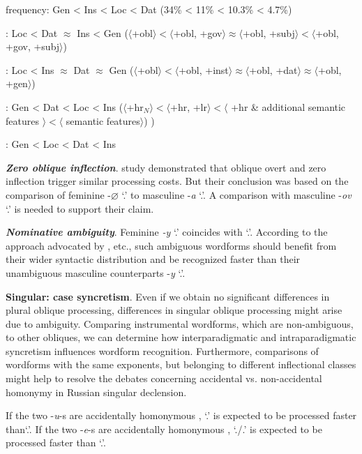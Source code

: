\documentclass[output=paper, modfonts,newtxmath,hidelinks]{langscibook}
\begin{document}
\ea \ea \label{ex:freqpl} frequency: Gen < Ins < Loc < Dat (34\% < 11\% < 10.3\% < 4.7\%)
    
    \ex \label{ex:mueller}  \citealt{muller2004decomposing}: Loc < Dat $\approx$ Ins < Gen ($\langle$+obl$\rangle < \langle$+obl, +gov$\rangle \approx \langle$+obl, +subj$\rangle < \langle$+obl, +gov, +subj$\rangle$)
    
    \ex \label{ex:wiese}	\citealt{wiese2004categories}:  Loc < Ins $\approx$ Dat $\approx$ Gen ($\langle$+obl$\rangle < \langle$+obl, +inst$\rangle \approx \langle$+obl, +dat$\rangle \approx \langle$+obl, +gen$\rangle$)
    
    \ex \label{ex:wunderlich}	\citealt{wunderlich1996minimalist}: Gen < Dat < Loc < Ins ($\langle$+hr$_N \rangle < \langle$+hr, +lr$\rangle < \langle$ +hr \& additional semantic features $\rangle < \langle$ semantic features$\rangle$) 
)
    
    \ex \label{ex:caha} \citealt{caha2008case}: Gen < Loc < Dat < Ins
    \z
\z

\textbf{\textit{Zero oblique inflection}}.  study demonstrated that oblique overt and zero inflection trigger similar processing costs. But their conclusion was based on the comparison of feminine -$\varnothing$ `\genn.\pl' to masculine -\textit{a} `\genn.\sg'. A comparison with masculine -\textit{ov} `\genn.\pl' is needed to support their claim.

\textbf{\textit{Nominative ambiguity}}. Feminine \textit{-y} `\nomm.\pl' coincides with `\genn.\sg'. According to the approach advocated by \citet{kostic1991informational}, etc., such ambiguous wordforms should benefit from their wider syntactic distribution and be recognized faster than their unambiguous masculine counterparts -\textit{y} `\nomm.\pl'.

\textbf{Singular: case syncretism}. Even if we obtain no significant differences in plural oblique processing, differences in singular oblique processing might arise due to ambiguity. Comparing instrumental wordforms, which are non-ambiguous, to other obliques, we can determine how interparadigmatic and intraparadigmatic syncretism influences wordform recognition. Furthermore, comparisons of wordforms with the same exponents, but belonging to different inflectional classes might help to  resolve the debates concerning accidental vs. non-accidental homo\-nymy in Russian singular declension.

If the two -\textit{u}-s are accidentally homonymous  \citep{wiese2004categories}, `\accc.\fem' is expected to be processed faster than`\datt.\masc'. If the two -\textit{e}-s are accidentally homonymous \citep{muller2004decomposing}, `\datt./\locc.\fem' is expected to be processed faster than `\locc.\masc'.
\end{document}
